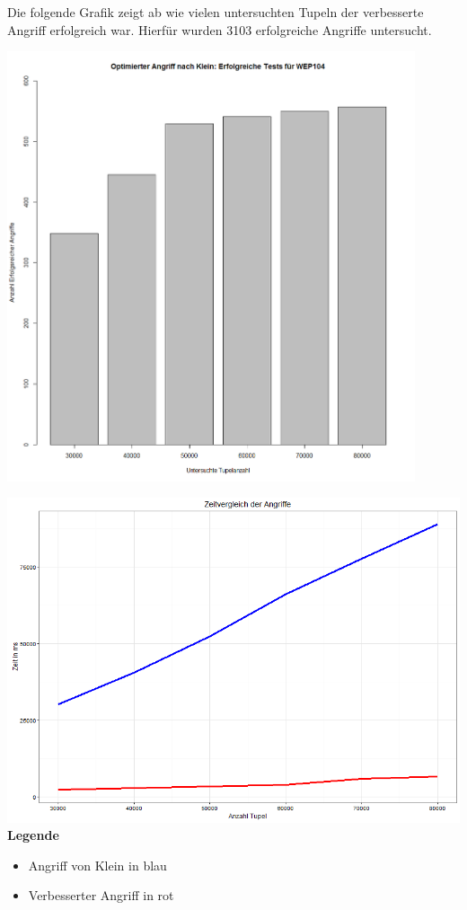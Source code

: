 \documentclass[10pt,a4paper]{article}
\begin{document}
Die folgende Grafik zeigt ab wie vielen untersuchten Tupeln der verbesserte Angriff erfolgreich war. Hierfür wurden 3103 erfolgreiche Angriffe untersucht. 
\begin{center}
\includegraphics[width=0.9\textwidth]{img/WEP_104_erfolgreich.png}
\label{fig:wep100_suc}
\end{center}
\newpage

\includegraphics[width=\textwidth]{img/vergleich.png}
\label{fig:vergleich}
\\
\textbf{Legende}
\begin{itemize}
	\item[] Angriff von Klein in blau
	\item[] Verbesserter Angriff in rot
\end{itemize}


\newpage

\nocite{*}
\printbibliography
\end{document}
